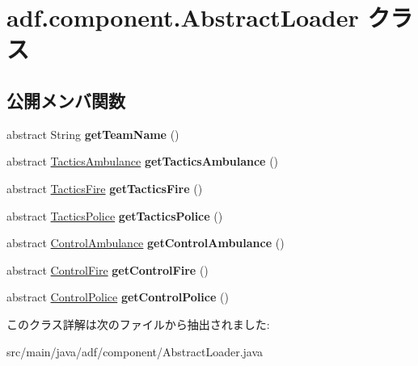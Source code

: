 \hypertarget{classadf_1_1component_1_1AbstractLoader}{}\section{adf.\+component.\+Abstract\+Loader クラス}
\label{classadf_1_1component_1_1AbstractLoader}
\subsection*{公開メンバ関数}
\begin{DoxyCompactItemize}
\item 
\hypertarget{classadf_1_1component_1_1AbstractLoader_a295d96c63465aa594b5b8a8137cbfd96}{}\label{classadf_1_1component_1_1AbstractLoader_a295d96c63465aa594b5b8a8137cbfd96} 
abstract String {\bfseries get\+Team\+Name} ()
\item 
\hypertarget{classadf_1_1component_1_1AbstractLoader_aa51ed4518181e2fb4ecc2ede1a37c095}{}\label{classadf_1_1component_1_1AbstractLoader_aa51ed4518181e2fb4ecc2ede1a37c095} 
abstract \hyperlink{classadf_1_1component_1_1tactics_1_1TacticsAmbulance}{Tactics\+Ambulance} {\bfseries get\+Tactics\+Ambulance} ()
\item 
\hypertarget{classadf_1_1component_1_1AbstractLoader_a65bd38d51297afe669f520a06a8370a5}{}\label{classadf_1_1component_1_1AbstractLoader_a65bd38d51297afe669f520a06a8370a5} 
abstract \hyperlink{classadf_1_1component_1_1tactics_1_1TacticsFire}{Tactics\+Fire} {\bfseries get\+Tactics\+Fire} ()
\item 
\hypertarget{classadf_1_1component_1_1AbstractLoader_a3d3610a866da0281a666f89ffff97e81}{}\label{classadf_1_1component_1_1AbstractLoader_a3d3610a866da0281a666f89ffff97e81} 
abstract \hyperlink{classadf_1_1component_1_1tactics_1_1TacticsPolice}{Tactics\+Police} {\bfseries get\+Tactics\+Police} ()
\item 
\hypertarget{classadf_1_1component_1_1AbstractLoader_ae0e863e62dd52b91bb7c4f7aef2352aa}{}\label{classadf_1_1component_1_1AbstractLoader_ae0e863e62dd52b91bb7c4f7aef2352aa} 
abstract \hyperlink{classadf_1_1component_1_1control_1_1ControlAmbulance}{Control\+Ambulance} {\bfseries get\+Control\+Ambulance} ()
\item 
\hypertarget{classadf_1_1component_1_1AbstractLoader_a74108335029b07d140ea618a899fbe24}{}\label{classadf_1_1component_1_1AbstractLoader_a74108335029b07d140ea618a899fbe24} 
abstract \hyperlink{classadf_1_1component_1_1control_1_1ControlFire}{Control\+Fire} {\bfseries get\+Control\+Fire} ()
\item 
\hypertarget{classadf_1_1component_1_1AbstractLoader_a7b063a5b8721c74ae633a8ff5c7f1bd3}{}\label{classadf_1_1component_1_1AbstractLoader_a7b063a5b8721c74ae633a8ff5c7f1bd3} 
abstract \hyperlink{classadf_1_1component_1_1control_1_1ControlPolice}{Control\+Police} {\bfseries get\+Control\+Police} ()
\end{DoxyCompactItemize}


このクラス詳解は次のファイルから抽出されました\+:\begin{DoxyCompactItemize}
\item 
src/main/java/adf/component/Abstract\+Loader.\+java\end{DoxyCompactItemize}
